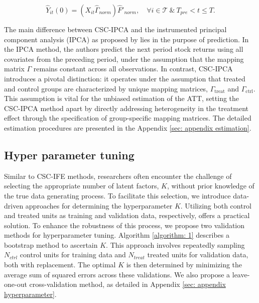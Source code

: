 \documentclass[12pt]{article}
\begin{document}
\begin{equation}
\hat{Y}_{it}(0) = (X_{it} \hat{\Gamma}_{norm}) \hat{F}'_{norm}, \quad \forall i \in \mathcal{T} \ \& \ T_{pre} < t \leq T.
\end{equation}

The main difference between CSC-IPCA and the instrumented principal component analysis (IPCA) as proposed by \cite{kelly2020instrumented} lies in the purpose of prediction. In the IPCA method, the authors predict the next period stock returns using all covariates from the preceding period, under the assumption that the mapping matrix $\Gamma$ remains constant across all observations. In contrast, CSC-IPCA introduces a pivotal distinction: it operates under the assumption that treated and control groups are characterized by unique mapping matrices, $\Gamma_{\text{treat}}$ and $\Gamma_{\text{ctrl}}$. This assumption is vital for the unbiased estimation of the ATT, setting the CSC-IPCA method apart by directly addressing heterogeneity in the treatment effect through the specification of group-specific mapping matrices. The detailed estimation procedures are presented in the Appendix \ref{sec: appendix estimation}.

\subsection{Hyper parameter tuning}
Similar to CSC-IFE methods, researchers often encounter the challenge of selecting the appropriate number of latent factors, $K$, without prior knowledge of the true data generating process. To facilitate this selection, we introduce data-driven approaches for determining the hyperparameter $K$. Utilizing both control and treated units as training and validation data, respectively, offers a practical solution. To enhance the robustness of this process, we propose two validation methods for hyperparameter tuning. Algorithm \ref{algorithm: 1} describes a bootstrap method to ascertain $K$. This approach involves repeatedly sampling $N_{ctrl}$ control units for training data and $N_{treat}$ treated units for validation data, both with replacement. The optimal $K$ is then determined by minimizing the average sum of squared errors across these validations. We also propose a leave-one-out cross-validation method, as detailed in Appendix \ref{sec: appendix hyperparameter}.
\end{document}
